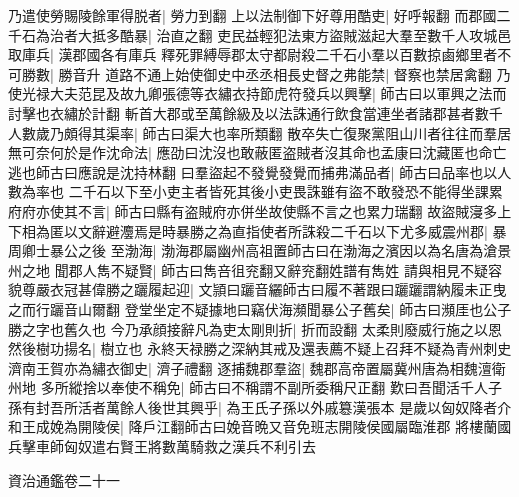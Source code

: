 乃遣使勞賜陵餘軍得脱者|{
	勞力到翻}
上以法制御下好尊用酷吏|{
	好呼報翻}
而郡國二千石為治者大抵多酷暴|{
	治直之翻}
吏民益輕犯法東方盜賊滋起大羣至數千人攻城邑取庫兵|{
	漢郡國各有庫兵}
釋死罪縛辱郡太守都尉殺二千石小羣以百數掠鹵鄉里者不可勝數|{
	勝音升}
道路不通上始使御史中丞丞相長史督之弗能禁|{
	督察也禁居禽翻}
乃使光禄大夫范昆及故九卿張德等衣繡衣持節虎符發兵以興擊|{
	師古曰以軍興之法而討擊也衣繡於計翻}
斬首大郡或至萬餘級及以法誅通行飲食當連坐者諸郡甚者數千人數歲乃頗得其渠率|{
	師古曰渠大也率所類翻}
散卒失亡復聚黨阻山川者往往而羣居無可奈何於是作沈命法|{
	應劭曰沈沒也敢蔽匿盗賊者沒其命也孟康曰沈藏匿也命亡逃也師古曰應說是沈持林翻}
曰羣盜起不發覺發覺而捕弗滿品者|{
	師古曰品率也以人數為率也}
二千石以下至小吏主者皆死其後小吏畏誅雖有盜不敢發恐不能得坐課累府府亦使其不言|{
	師古曰縣有盗賊府亦併坐故使縣不言之也累力瑞翻}
故盜賊寖多上下相為匿以文辭避灋焉是時暴勝之為直指使者所誅殺二千石以下尤多威震州郡|{
	暴周卿士暴公之後}
至渤海|{
	渤海郡屬幽州高祖置師古曰在渤海之濱因以為名唐為滄景州之地}
聞郡人雋不疑賢|{
	師古曰雋咅徂兖翻又辭兖翻姓譜有雋姓}
請與相見不疑容貌尊嚴衣冠甚偉勝之躧履起迎|{
	文頴曰躧音纚師古曰履不著跟曰躧躧謂納履未正曳之而行躧音山爾翻}
登堂坐定不疑據地曰竊伏海瀕聞暴公子舊矣|{
	師古曰瀕厓也公子勝之字也舊久也}
今乃承顔接辭凡為吏太剛則折|{
	折而設翻}
太柔則廢威行施之以恩然後樹功揚名|{
	樹立也}
永終天禄勝之深納其戒及還表薦不疑上召拜不疑為青州刺史濟南王賀亦為繡衣御史|{
	濟子禮翻}
逐捕魏郡羣盜|{
	魏郡高帝置屬冀州唐為相魏澶衛州地}
多所縱捨以奉使不稱免|{
	師古曰不稱謂不副所委稱尺正翻}
歎曰吾聞活千人子孫有封吾所活者萬餘人後世其興乎|{
	為王氏子孫以外戚簒漢張本}
是歲以匈奴降者介和王成娩為開陵侯|{
	降戶江翻師古曰娩音晩又音免班志開陵侯國屬臨淮郡}
將樓蘭國兵擊車師匈奴遣右賢王將數萬騎救之漢兵不利引去

資治通鑑卷二十一
